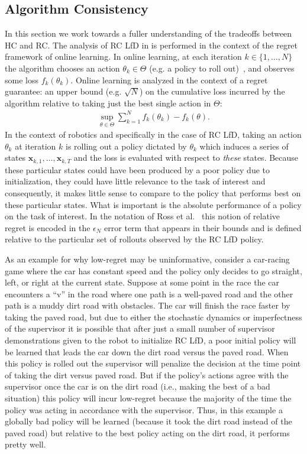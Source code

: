 \documentclass[10pt, conference]{ieeeconf}      %
\newcommand{\bx}{\mathbf{x}}
\begin{document}
\subsection{Algorithm Consistency}\label{sec:consistent}
In this section we work towards a fuller understanding of the tradeoffs between HC and RC. The analysis of RC LfD in \cite{ross2010reduction} is performed in the context of the regret framework of online learning. 
In online learning, at each iteration $k \in \{1,\dots,N\}$ the algorithm chooses an action $\theta_k \in \Theta$ (e.g. a policy to roll out)~\cite{shalev2011online}, and observes some loss $f_k(\theta_k)$. 
Online learning is analyzed in the context of a regret guarantee: an upper bound (e.g. $\sqrt{N}$) on the cumulative loss incurred by the algorithm relative to taking just the best single action in $\Theta$:
\begin{align*}
\sup_{\theta \in \Theta} \sum_{k=1}^N f_k(\theta_k) - f_k(\theta).
\end{align*}
In the context of robotics and specifically in the case of RC LfD, taking an action $\theta_k$ at iteration $k$ is rolling out a policy dictated by $\theta_k$ which induces a series of states $\bx_{k,1},\dots,\bx_{k,T}$ and the loss is evaluated with respect to {\em these} states.  
Because these particular states could have been produced by a poor policy due to initialization, they could have little relevance to the task of interest and consequently, it makes little sense to compare to the policy that performs best on these particular states.
What is important is the absolute performance of a policy on the task of interest. 
In the notation of Ross et al.~\cite{ross2010reduction} this notion of relative regret is encoded in the $\epsilon_N$ error term that appears in their bounds and is defined relative to the particular set of rollouts observed by the RC LfD policy.

As an example for why low-regret may be uninformative, consider a car-racing game where the car has constant speed and the policy only decides to go straight, left, or right at the current state. 
Suppose at some point in the race the car encounters a ``v'' in the road where one path is a well-paved road and the other path is a muddy dirt road with obstacles. 
The car will finish the race faster by taking the paved road, but due to either the stochastic dynamics or imperfectness of the supervisor it is possible that after just a small number of supervisor demonstrations given to the robot to initialize RC LfD, a poor initial policy will be learned that leads the car down the dirt road versus the paved road. 
When this policy is rolled out the supervisor will penalize the decision at the time point of taking the dirt versus paved road. 
But if the policy's actions agree with the supervisor once the car is on the dirt road (i.e., making the best of a bad situation) this policy will incur low-regret because the majority of the time the policy was acting in accordance with the supervisor.
Thus, in this example a globally bad policy will be learned (because it took the dirt road instead of the paved road) but relative to the best policy acting on the dirt road, it performs pretty well. 
\end{document}

